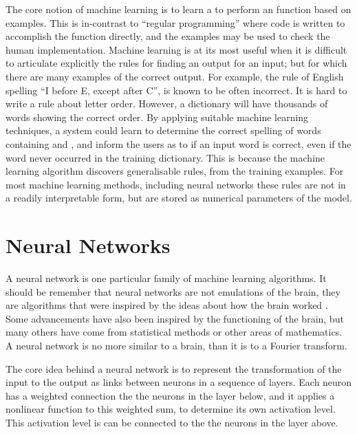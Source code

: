 \documentclass[12pt,parskip]{komatufte}
\begin{document}
The core notion of machine learning is to learn a to perform an function based on examples.
This is in-contrast to ``regular programming'' where code is written to accomplish the function directly, and the examples may be used to check the human implementation.
Machine learning is at its most useful when it is difficult to articulate explicitly the rules for finding an output for an input; but for which there are many examples of the correct output.
For example, the rule of English spelling ``I before E, except after C'', is known to be often incorrect.
It is hard to write a rule about letter order.
However, a dictionary will have thousands of words showing the correct order.
By applying suitable machine learning techniques,
a system could learn to determine the correct spelling of words containing  and ,
and inform the users as to if an input word is correct, even if the word never occurred in the training dictionary.
This is because the machine learning algorithm discovers generalisable rules,
from the training examples.
For most machine learning methods, including neural networks these rules are not in a readily interpretable form, but are stored as numerical parameters of the model.

\section{Neural Networks}

A neural network is one particular family of machine learning algorithms.
It should be remember that neural networks are not emulations of the brain,
they are algorithms that were inspired by the ideas about how the brain worked .
Some advancements have also been inspired by the functioning of the brain,
but many others have come from statistical methods or other areas of mathematics.
A neural network is no more similar to a brain, than it is to a Fourier transform.

The core idea behind a neural network is to represent the transformation of the input to the output as links between neurons in a sequence of layers.
Each neuron has a weighted connection the the neurons in the layer below,
and it applies a nonlinear function to this weighted sum, 
to determine its own activation level.
This activation level is can be connected to the the neurons in the layer above.
\end{document}
